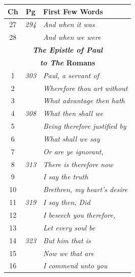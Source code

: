 \documentclass{article}
\newlength{\minipageheight}
\newlength{\minipagewidth}
\begin{document}
\begin{minipage}[r][\minipageheight][t]{\minipagewidth}%
    \begin{longtable}{ccl}
        \textbf{Ch} & \textbf{Pg}  & \textbf{First Few Words}                     \\%
        \hline%
        \endfirsthead%
        27          & \textit{294} & \textit{And when it was}                     \\
        28          &              & \textit{And when we were}                    \\

        \multicolumn{3}{c}{\textbf{\textit{The Epistle of Paul}}}                 \\
        \multicolumn{3}{c}{\textbf{\textit{to The} Romans}}                       \\
        \hline
        1           & \textit{303} & \textit{Paul, a servant of}                  \\
        2           &              & \textit{Wherefore thou art without}          \\
        3           &              & \textit{What advantage then hath}            \\
        4           & \textit{308} & \textit{What then shall we}                  \\
        5           &              & \textit{Being therefore justified by}        \\
        6           &              & \textit{What shall we say}                   \\
        7           &              & \textit{Or are ye ignorant,}                 \\
        8           & \textit{313} & \textit{There is therefore now}              \\
        9           &              & \textit{I say the truth}                     \\
        10          &              & \textit{Brethren, my heart’s desire}         \\
        11          & \textit{319} & \textit{I say then, Did}                     \\
        12          &              & \textit{I beseech you therefore,}            \\
        13          &              & \textit{Let every soul be}                   \\
        14          & \textit{323} & \textit{But him that is}                     \\
        15          &              & \textit{Now we that are}                     \\
        16          &              & \textit{I commend unto you}                  \\


\end{longtable}
\end{minipage}
\end{document}
